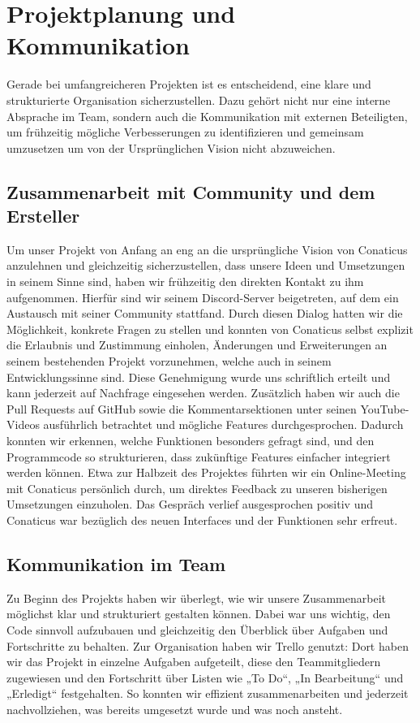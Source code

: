 \section{Projektplanung und Kommunikation}\label{sec:Absprache mit Ersteller und Community} 

Gerade bei umfangreicheren Projekten ist es entscheidend, eine klare und strukturierte Organisation
sicherzustellen. Dazu gehört nicht nur eine interne Absprache im Team, sondern auch die
Kommunikation mit externen Beteiligten, um frühzeitig mögliche Verbesserungen zu identifizieren und
gemeinsam umzusetzen um von der Ursprünglichen Vision nicht abzuweichen. 

\subsection{Zusammenarbeit mit Community und dem Ersteller}\label{sec:Zusammenarbeit mit Community und dem Ersteller} %

Um unser Projekt von Anfang an eng an die ursprüngliche Vision von Conaticus anzulehnen und
gleichzeitig sicherzustellen, dass unsere Ideen und Umsetzungen in seinem Sinne sind, haben wir
frühzeitig den direkten Kontakt zu ihm aufgenommen. Hierfür sind wir seinem Discord-Server
beigetreten, auf dem ein Austausch mit seiner Community stattfand. Durch diesen Dialog hatten wir
die Möglichkeit, konkrete Fragen zu stellen und konnten von Conaticus selbst explizit die Erlaubnis
und Zustimmung einholen, Änderungen und Erweiterungen an seinem bestehenden Projekt vorzunehmen,
welche auch in seinem Entwicklungssinne sind. Diese Genehmigung wurde uns schriftlich erteilt und
kann jederzeit auf Nachfrage eingesehen werden. Zusätzlich haben wir auch die Pull Requests auf
GitHub sowie die Kommentarsektionen unter seinen YouTube-Videos ausführlich betrachtet und mögliche
Features durchgesprochen. Dadurch konnten wir erkennen, welche Funktionen besonders gefragt sind,
und den Programmcode so strukturieren, dass zukünftige Features einfacher integriert werden können.
Etwa zur Halbzeit des Projektes führten wir ein Online-Meeting mit Conaticus persönlich durch, um
direktes Feedback zu unseren bisherigen Umsetzungen einzuholen. Das Gespräch verlief ausgesprochen
positiv und Conaticus war bezüglich des neuen Interfaces und der Funktionen sehr erfreut.

\subsection{Kommunikation im Team}

Zu Beginn des Projekts haben wir überlegt, wie wir unsere Zusammenarbeit möglichst klar und
strukturiert gestalten können. Dabei war uns wichtig, den Code sinnvoll aufzubauen und gleichzeitig
den Überblick über Aufgaben und Fortschritte zu behalten. Zur Organisation haben wir Trello genutzt:
Dort haben wir das Projekt in einzelne Aufgaben aufgeteilt, diese den Teammitgliedern zugewiesen und
den Fortschritt über Listen wie „To Do“, „In Bearbeitung“ und „Erledigt“ festgehalten. So konnten
wir effizient zusammenarbeiten und jederzeit nachvollziehen, was bereits umgesetzt wurde und was
noch ansteht.
